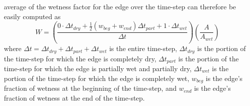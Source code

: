 \documentclass[letterpaper,10pt]{article}
\begin{document}
average of the wetness factor for the edge over the time-step can 
therefore be easily computed as
\begin{equation}
        W=\left(\frac{0\cdot\Delta t_{dry} +\frac{1}{2}(w_{beg}+w_{end})\Delta t_{part}+1\cdot\Delta t_{wet}}{\Delta t}\right) \left(\frac{A}{A_{wet}}\right)
        \label{wetnessfactor}
\end{equation}
where $\Delta t=\Delta t_{dry}+\Delta t_{part}+\Delta t_{wet}$ is the 
entire time-step, $\Delta t_{dry}$ is the portion of the time-step for 
which the edge is completely dry, $\Delta t_{part}$ is the portion of 
the time-step for which the edge is partially wet and partially dry, 
$\Delta t_{wet}$ is the portion of the time-step for which the edge is 
completely wet, $w_{beg}$ is the edge's fraction of wetness at the 
beginning of the time-step, and $w_{end}$ is the edge's fraction of 
wetness at the end of the time-step.
\end{document}
